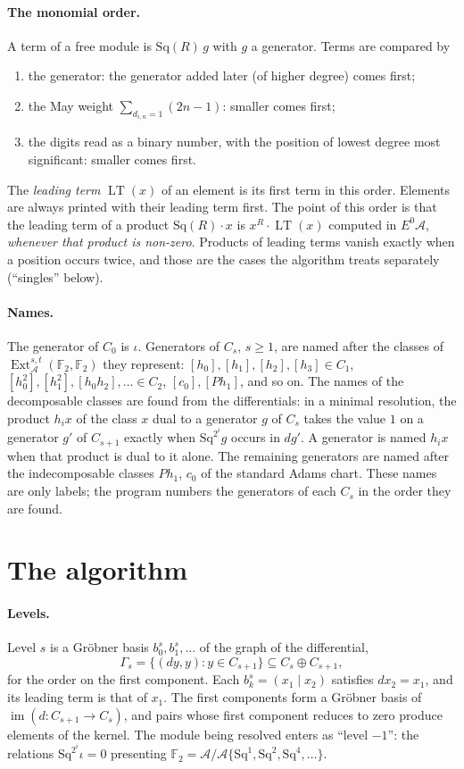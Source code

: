 \documentclass[11pt]{article}
\newcommand{\Sq}{\mathrm{Sq}}
\newcommand{\F}{\mathbb{F}_2}
\newcommand{\A}{\mathcal{A}}
\DeclareMathOperator{\LT}{LT}
\DeclareMathOperator{\Ext}{Ext}
\begin{document}
\paragraph{The monomial order.}
A term of a free module is $\Sq(R)\,g$ with $g$ a generator. Terms are compared by
\begin{enumerate}
\item the generator: the generator added later (of higher degree) comes first;
\item the May weight $\sum_{d_{i,n} = 1} (2n - 1)$: smaller comes first;
\item the digits read as a binary number, with the position of lowest degree most significant:
  smaller comes first.
\end{enumerate}
The \emph{leading term} $\LT(x)$ of an element is its first term in this order. Elements are
always printed with their leading term first. The point of this order is that the leading term
of a product $\Sq(R)\cdot x$ is $x^R \cdot \LT(x)$ computed in $E^0\A$, \emph{whenever that
product is non-zero}. Products of leading terms vanish exactly when a position occurs twice, and
those are the cases the algorithm treats separately (``singles'' below).

\paragraph{Names.}
The generator of $C_0$ is $\iota$. Generators of $C_s$, $s \ge 1$, are named after the classes of
$\Ext_\A^{s,t}(\F, \F)$ they represent: $[h_0], [h_1], [h_2], [h_3] \in C_1$, $[h_0^2], [h_1^2],
[h_0h_2], \dots \in C_2$, $[c_0], [Ph_1]$, and so on. The names of the decomposable classes are
found from the differentials: in a minimal resolution, the product $h_i x$ of the class $x$ dual to
a generator $g$ of $C_s$ takes the value $1$ on a generator $g'$ of $C_{s+1}$ exactly when
$\Sq^{2^i} g$ occurs in $d g'$. A generator is named $h_i x$ when that product is dual to it alone.
The remaining generators are named after the indecomposable classes $Ph_1$, $c_0$ of the standard Adams chart. These names are only labels; the program numbers the generators of
each $C_s$ in the order they are found.

\section{The algorithm}

\paragraph{Levels.}
Level $s$ is a Gröbner basis $b^s_0, b^s_1, \dots$ of the graph of the differential,
\[ \Gamma_s = \{ (d y, y) : y \in C_{s+1} \} \subseteq C_s \oplus C_{s+1}, \]
for the order on the first component. Each $b^s_k = (x_1 \mid x_2)$ satisfies $d x_2 = x_1$,
and its leading term is that of $x_1$. The first components form a Gröbner basis of
$\operatorname{im}(d \colon C_{s+1} \to C_s)$, and pairs whose first component reduces to zero
produce elements of the kernel. The module being resolved enters as ``level $-1$'': the relations
$\Sq^{2^i}\iota = 0$ presenting $\F = \A/\A\{\Sq^1, \Sq^2, \Sq^4, \dots\}$.
\end{document}
